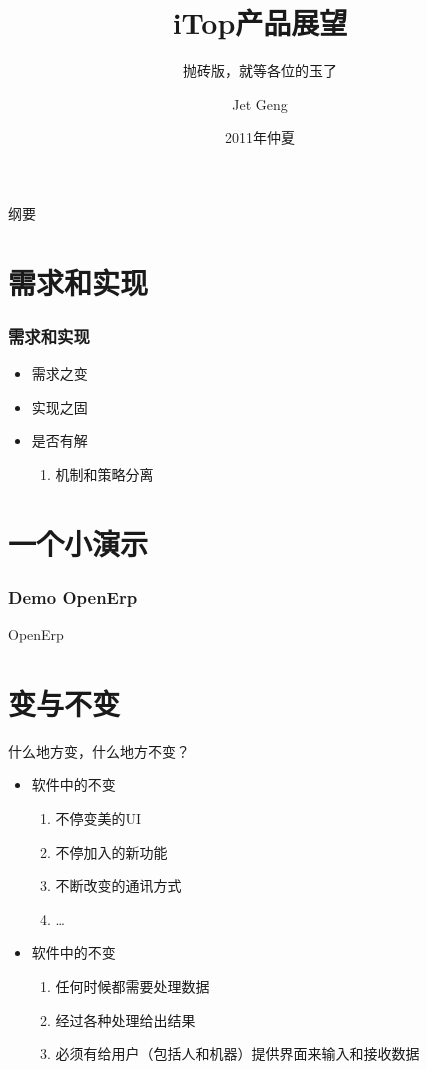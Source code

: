 \documentclass{beamer}
\title[iTop产品展望]{iTop产品展望}
\subtitle[LaTeX for slide]{抛砖版，就等各位的玉了}
\author[Jet Geng]{Jet Geng}
\institute[zthz.com.cn]{中天合志研发中心}
\date[Dec, 2011]{2011年仲夏}
\begin{document}
\begin{frame}
	\titlepage
\end{frame}

\begin{frame}{纲要}
 	\tableofcontents
 \end{frame}

\section{需求和实现}
\begin{frame}
    \frametitle{需求和实现}
    \pause
    \begin{itemize}
        \item 需求之变
        \item 实现之固
        \item 是否有解
            \begin{enumerate}
                \item 机制和策略分离
            \end{enumerate}
    \end{itemize}
\end{frame}

\section{一个小演示}
\begin{frame}
    \frametitle{Demo OpenErp}
    \pause
     \begin{centering}
      \Huge OpenErp \par
    \end{centering}
\end{frame}

\section{变与不变}
\begin{frame}{什么地方变，什么地方不变？}
    \begin{itemize}
    \pause
        \item 软件中的不变
            \begin{enumerate}
                \item 不停变美的UI
                \item 不停加入的新功能
                \item 不断改变的通讯方式
                \item \ldots 
            \end{enumerate}
        \item 软件中的不变
            \begin{enumerate}
                \item 任何时候都需要处理数据
                \item 经过各种处理给出结果
                \item 必须有给用户（包括人和机器）提供界面来输入和接收数据
            \end{enumerate}
    \end{itemize}
\end{frame}
\end{document}
